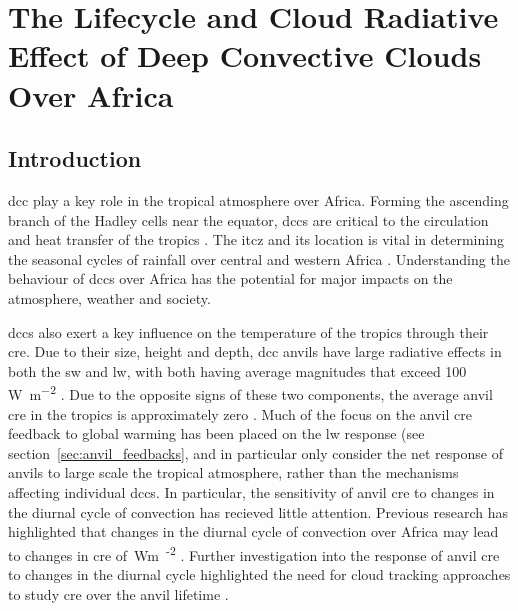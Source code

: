 \chapter{The Lifecycle and Cloud Radiative Effect of Deep Convective Clouds Over Africa} \label{chp:radiative_effect}

\section{Introduction}  %
\acrshort{dcc} play a key role in the tropical atmosphere over Africa. 
Forming the ascending branch of the Hadley cells near the equator, \acrshort{dcc}s are critical to the circulation and heat transfer of the tropics \citep{riehl_heat_1958, weisman_mesoscale_2015}. 
The \acrshort{itcz} and its location is vital in determining the seasonal cycles of rainfall over central and western Africa \citep{nicholson_revised_2009, nicholson_itcz_2018}.
Understanding the behaviour of \acrshort{dcc}s over Africa has the potential for major impacts on the atmosphere, weather and society.

% 

\acrshort{dcc}s also exert a key influence on the temperature of the tropics through their \acrshort{cre}. 
Due to their size, height and depth, \acrshort{dcc} anvils have large radiative effects in both the \acrshort{sw} and \acrshort{lw}, with both having average magnitudes that exceed 100\,\unit{W m^{-2}} \citep{hartmann_tropical_2016, wall_balanced_2018}. 
Due to the opposite signs of these two components, the average anvil \acrshort{cre} in the tropics is approximately zero \citep{ramanathan_cloud-radiative_1989, hartmann_effect_1992, stephens_cloudsat_2018}. 
Much of the focus on the anvil \acrshort{cre} feedback to global warming has been placed on the \acrshort{lw} response (see section~\ref{sec:anvil_feedbacks}, and in particular only consider the net response of anvils to large scale the tropical atmosphere, rather than the mechanisms affecting individual \acrshort{dcc}s.
In particular, the sensitivity of anvil \acrshort{cre} to changes in the diurnal cycle of convection has recieved little attention.
Previous research has highlighted that changes in the diurnal cycle of convection over Africa may lead to changes in \acrshort{cre} of \,\unit{Wm\textsuperscript{-2}} \citep{nowicki_observations_2004}.
Further investigation into the response of anvil \acrshort{cre} to changes in the diurnal cycle highlighted the need for cloud tracking approaches to study \acrshort{cre} over the anvil lifetime \citep{bouniol_macrophysical_2016, bouniol_life_2021}.


